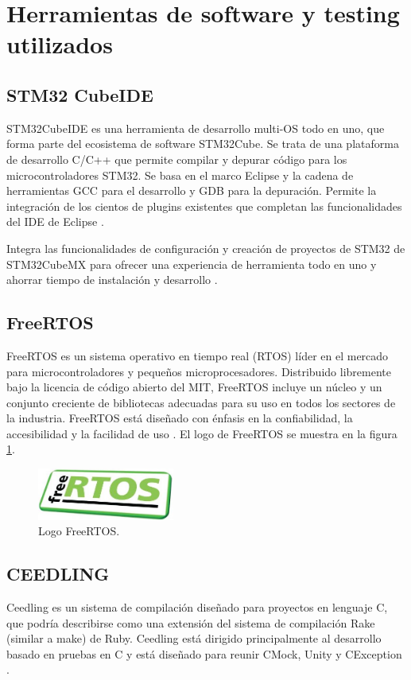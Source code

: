 \section{Herramientas de software y testing utilizados}
\subsection{STM32 CubeIDE}
STM32CubeIDE es una herramienta de desarrollo multi-OS todo en uno, que forma parte del ecosistema de software STM32Cube. Se trata de una plataforma de desarrollo C/C++ que permite compilar y depurar código para los microcontroladores STM32. Se basa en el marco Eclipse  y la cadena de herramientas GCC para el desarrollo y GDB para la depuración. Permite la integración de los cientos de plugins existentes que completan las funcionalidades del IDE de Eclipse \citep{STM32CUBEIDE}.

Integra las funcionalidades de configuración y creación de proyectos de STM32 de STM32CubeMX para ofrecer una experiencia de herramienta todo en uno y ahorrar tiempo de instalación y desarrollo \citep{STM32CUBEIDE}.

\subsection{FreeRTOS}
\label{subsec:FreeRTOS}
FreeRTOS es un sistema operativo en tiempo real (RTOS) líder en el mercado para microcontroladores y pequeños microprocesadores. Distribuido libremente bajo la licencia de código abierto del MIT, FreeRTOS incluye un núcleo y un conjunto creciente de bibliotecas adecuadas para su uso en todos los sectores de la industria.
FreeRTOS está diseñado con énfasis en la confiabilidad, la accesibilidad y la facilidad de uso \citep{FreeRTOS}. El logo de FreeRTOS se muestra en la figura \ref{fig:FreeRTOS}.
\begin{figure}[htbp]
	\centering
	\includegraphics[width=0.4\textwidth]{./Figures/logo_FreeRTOS.jpg}
	\caption{Logo FreeRTOS.}
	\label{fig:FreeRTOS}
\end{figure}
\subsection{CEEDLING}
Ceedling es un sistema de compilación diseñado para proyectos en lenguaje C, que podría describirse como una extensión del sistema de compilación Rake (similar a make) de Ruby. Ceedling está dirigido principalmente al desarrollo basado en pruebas en C y está diseñado para reunir CMock, Unity y CException \citep{CEEDLING}.

